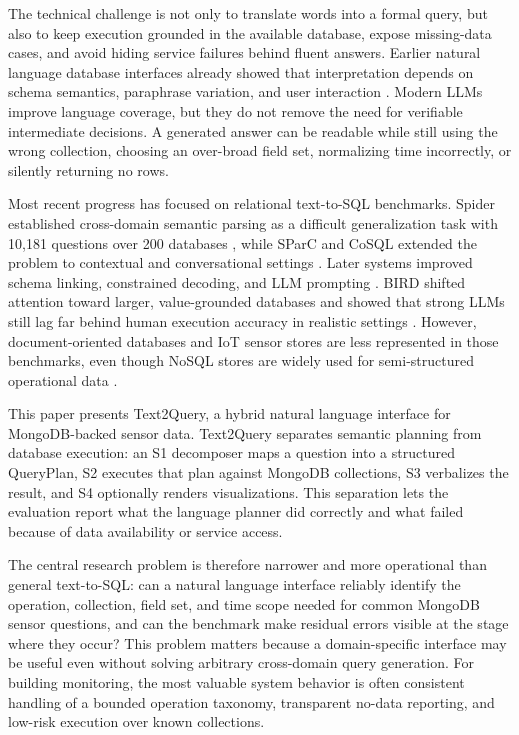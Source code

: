 \documentclass[11pt]{article}
\begin{document}
The technical challenge is not only to translate words into a formal query, but also to keep execution grounded in the available database, expose missing-data cases, and avoid hiding service failures behind fluent answers. Earlier natural language database interfaces already showed that interpretation depends on schema semantics, paraphrase variation, and user interaction \cite{androutsopoulos1995nlidb,zelle1996geoquery,popescu2003precise,li2015nalir}. Modern LLMs improve language coverage, but they do not remove the need for verifiable intermediate decisions. A generated answer can be readable while still using the wrong collection, choosing an over-broad field set, normalizing time incorrectly, or silently returning no rows.

Most recent progress has focused on relational text-to-SQL benchmarks. Spider established cross-domain semantic parsing as a difficult generalization task with 10,181 questions over 200 databases \cite{yu2018spider}, while SParC and CoSQL extended the problem to contextual and conversational settings \cite{yu2019sparc,yu2019cosql}. Later systems improved schema linking, constrained decoding, and LLM prompting \cite{wang2020ratsql,scholak2021picard,pourreza2023dinsql,gao2023dailsql}. BIRD shifted attention toward larger, value-grounded databases and showed that strong LLMs still lag far behind human execution accuracy in realistic settings \cite{li2023bird}. However, document-oriented databases and IoT sensor stores are less represented in those benchmarks, even though NoSQL stores are widely used for semi-structured operational data \cite{davoudian2018nosql}.

This paper presents Text2Query, a hybrid natural language interface for MongoDB-backed sensor data. Text2Query separates semantic planning from database execution: an S1 decomposer maps a question into a structured QueryPlan, S2 executes that plan against MongoDB collections, S3 verbalizes the result, and S4 optionally renders visualizations. This separation lets the evaluation report what the language planner did correctly and what failed because of data availability or service access.

The central research problem is therefore narrower and more operational than general text-to-SQL: can a natural language interface reliably identify the operation, collection, field set, and time scope needed for common MongoDB sensor questions, and can the benchmark make residual errors visible at the stage where they occur? This problem matters because a domain-specific interface may be useful even without solving arbitrary cross-domain query generation. For building monitoring, the most valuable system behavior is often consistent handling of a bounded operation taxonomy, transparent no-data reporting, and low-risk execution over known collections.
\end{document}
